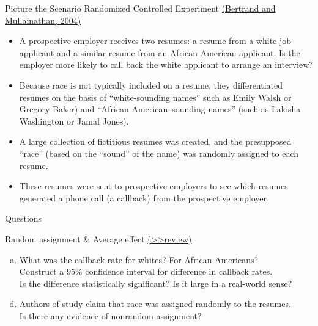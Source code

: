 \documentclass[
  10pt,
  ignorenonframetext,
]{beamer}
\providecommand{\tightlist}{%
  \setlength{\itemsep}{0pt}\setlength{\parskip}{0pt}}
\begin{document}
\begin{frame}{Picture the Scenario}
\protect\hypertarget{picture-the-scenario-1}{}
Randomized Controlled Experiment
\href{https://pubs-aeaweb-org.ezproxy2.lib.gla.ac.uk/doi/pdfplus/10.1257/0002828042002561}{(Bertrand
and Mullainathan, 2004)}

\begin{itemize}
\item
  A prospective employer receives two resumes: a resume from a white job
  applicant and a similar resume from an African American applicant. Is
  the employer more likely to call back the white applicant to arrange
  an interview?
\item
  Because race is not typically included on a resume, they
  differentiated resumes on the basis of ``white-sounding names'' such
  as Emily Walsh or Gregory Baker) and ``African American--sounding
  names'' (such as Lakisha Washington or Jamal Jones).
\item
  A large collection of fictitious resumes was created, and the
  presupposed ``race'' (based on the ``sound'' of the name) was randomly
  assigned to each resume.
\item
  These resumes were sent to prospective employers to see which resumes
  generated a phone call (a callback) from the prospective employer.
\end{itemize}
\end{frame}

\begin{frame}{Questions}
\protect\hypertarget{questions}{}
\begin{block}{Random assignment \& Average effect}
\protect\hypertarget{random-assignment-average-effect}{}
\footnotesize \protect\hyperlink{RCT}{(\textgreater\textgreater review)}
\normalsize

\begin{enumerate}
[(a)]
\tightlist
\item
  What was the callback rate for whites? For African Americans?\\
  Construct a \(95\%\) confidence interval for difference in callback
  rates.\\
  Is the difference statistically significant? Is it large in a
  real-world sense?
\end{enumerate}

\vspace{0.8mm}

\begin{enumerate}
[(a)]
\setcounter{enumi}{3}
\tightlist
\item
  Authors of study claim that race was assigned randomly to the
  resumes.\\
  Is there any evidence of nonrandom assignment?
\end{enumerate}
\end{block}
\end{frame}
\end{document}
